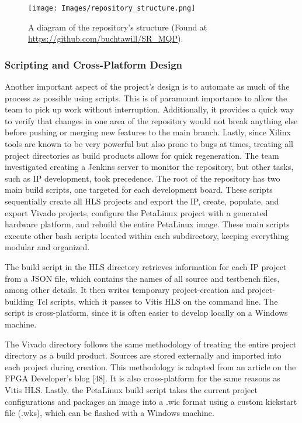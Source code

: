 \documentclass{article}
\begin{document}
        \begin{figure}[!tb] 
        \centering
        \texttt{[image: Images/repository\_structure.png]} 
        \caption{A diagram of the repository's structure (Found at \url{https://github.com/buchtawill/SR_MQP}).} 
        \label{fig:app_sw_high_level} 
    \end{figure}
        
        \subsubsection{Scripting and Cross-Platform Design}
        \noindent Another important aspect of the project's design is to automate as much of the process as possible using scripts. This is of paramount importance to allow the team to pick up work without interruption. Additionally, it provides a quick way to verify that changes in one area of the repository would not break anything else before pushing or merging new features to the main branch. Lastly, since Xilinx tools are known to be very powerful but also prone to bugs at times, treating all project directories as build products allows for quick regeneration. The team investigated creating a Jenkins server to monitor the repository, but other tasks, such as IP development, took precedence. The root of the repository has two main build scripts, one targeted for each development board. These scripts sequentially create all HLS projects and export the IP, create, populate, and export Vivado projects, configure the PetaLinux project with a generated hardware platform, and rebuild the entire PetaLinux image. These main scripts execute other bash scripts located within each subdirectory, keeping everything modular and organized.

        \par The build script in the HLS directory retrieves information for each IP project from a JSON file, which contains the names of all source and testbench files, among other details. It then writes temporary project-creation and project-building Tcl scripts, which it passes to Vitis HLS on the command line. The script is cross-platform, since it is often easier to develop locally on a Windows machine.

        \par The Vivado directory follows the same methodology of treating the entire project directory as a build product. Sources are stored externally and imported into each project during creation. This methodology is adapted from an article on the FPGA Developer’s blog [48]. It is also cross-platform for the same reasons as Vitis HLS. Lastly, the PetaLinux build script takes the current project configurations and packages an image into a .wic format using a custom kickstart file (.wks), which can be flashed with a Windows machine. 
\end{document}
